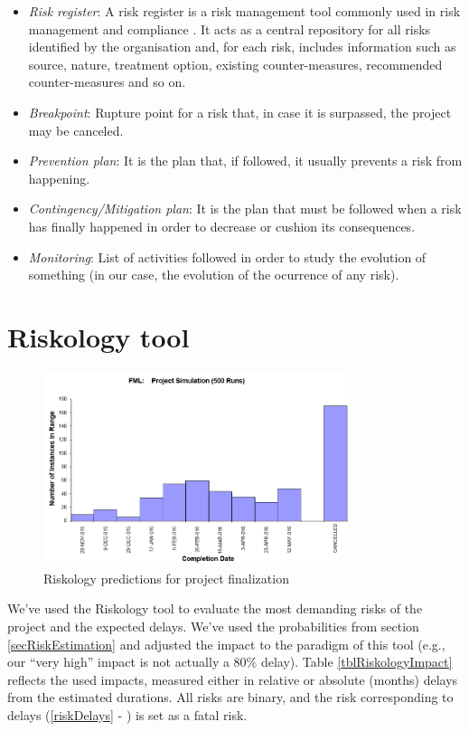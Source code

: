 \documentclass[11pt]{report}
\newcounter{risks}[subsection]
\newcommand{\rref}[1]{\ref{#1} - \nameref{#1}}
\begin{document}
\begin{itemize}
\item \emph{Risk register}: A risk register is a risk management tool commonly used in risk management and compliance . It acts as a central repository for all risks identified by the organisation and, for each risk, includes information such as source, nature, treatment option, existing counter-measures, recommended counter-measures and so on.

\item \emph{Breakpoint}: Rupture point for a risk that, in case it is surpassed, the project may be canceled.

\item \emph{Prevention plan}: It is the plan that, if followed, it usually prevents a risk from happening.

\item \emph{Contingency/Mitigation plan}: It is the plan that must be followed when a risk has finally happened in order to decrease or cushion its consequences.

\item \emph{Monitoring}: List of activities followed in order to study the evolution of something (in our case, the evolution of the ocurrence of any risk).
\end{itemize}

\chapter{Riskology tool}
\label{chapRiskology}

\begin{figure}[p]
\centering
\includegraphics[width=0.8\textwidth]{img/Riskology.png}
\caption{Riskology predictions for project finalization}
\label{figRiskology}
\end{figure}

We've used the Riskology tool \cite{riskology} to evaluate the most demanding risks of the project and the expected delays. We've used the probabilities from section \ref{secRiskEstimation} and adjusted the impact to the paradigm of this tool (e.g., our ``very high'' impact is not actually a 80\% delay). Table \ref{tblRiskologyImpact} reflects the used impacts, measured either in relative or absolute (months) delays from the estimated durations. All risks are binary, and the risk corresponding to delays (\rref{riskDelays}) is set as a fatal risk.
\end{document}
